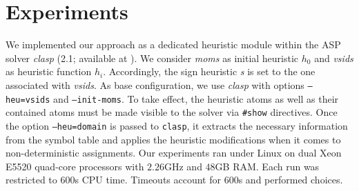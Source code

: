 \documentclass[letterpaper]{article}
\begin{document}


\section{Experiments}\label{sec:experiments}

We implemented our approach as a dedicated heuristic module within the ASP solver \textit{clasp}
(2.1; available at \cite{hclasp}).
We consider \textit{moms} \cite{pretolani96a} as initial heuristic $h_0$ and
\textit{vsids} \cite{momazhzhma01a} as heuristic function $h_i$.
Accordingly, the sign heuristic \textsl{s} is set to the one associated with \textit{vsids}.
As base configuration, we use \textit{clasp} with options \texttt{--heu=vsids} and \texttt{--init-moms}.
%
To take effect,
the heuristic atoms as well as their contained atoms must be made visible to the solver via \texttt{\#show} directives.
Once the option \texttt{--heu=domain} is passed to \texttt{clasp},
it extracts the necessary information from the symbol table and applies the heuristic modifications
when it comes to non-deterministic assignments.
%
Our experiments ran under Linux on dual Xeon E5520 quad-core processors with $2.26$GHz and $48$GB RAM.
Each run was restricted to 600s CPU time.
Timeouts account for 600s and performed choices.
\end{document}
